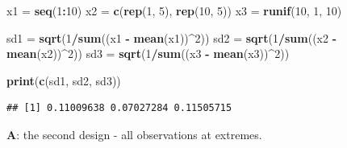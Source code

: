 \documentclass[10pt,ignorenonframetext,]{beamer}
\newenvironment{Shaded}{\begin{snugshade}}{\end{snugshade}}
\newcommand{\KeywordTok}[1]{\textcolor[rgb]{0.13,0.29,0.53}{\textbf{#1}}}
\newcommand{\DecValTok}[1]{\textcolor[rgb]{0.00,0.00,0.81}{#1}}
\newcommand{\StringTok}[1]{\textcolor[rgb]{0.31,0.60,0.02}{#1}}
\newcommand{\OperatorTok}[1]{\textcolor[rgb]{0.81,0.36,0.00}{\textbf{#1}}}
\newcommand{\NormalTok}[1]{#1}
\begin{document}
\begin{frame}[fragile]

\begin{Shaded}
\begin{Highlighting}[]
\NormalTok{x1 =}\StringTok{ }\KeywordTok{seq}\NormalTok{(}\DecValTok{1}\OperatorTok{:}\DecValTok{10}\NormalTok{)}
\NormalTok{x2 =}\StringTok{ }\KeywordTok{c}\NormalTok{(}\KeywordTok{rep}\NormalTok{(}\DecValTok{1}\NormalTok{, }\DecValTok{5}\NormalTok{), }\KeywordTok{rep}\NormalTok{(}\DecValTok{10}\NormalTok{, }\DecValTok{5}\NormalTok{))}
\NormalTok{x3 =}\StringTok{ }\KeywordTok{runif}\NormalTok{(}\DecValTok{10}\NormalTok{, }\DecValTok{1}\NormalTok{, }\DecValTok{10}\NormalTok{)}

\NormalTok{sd1 =}\StringTok{ }\KeywordTok{sqrt}\NormalTok{(}\DecValTok{1}\OperatorTok{/}\KeywordTok{sum}\NormalTok{((x1 }\OperatorTok{-}\StringTok{ }\KeywordTok{mean}\NormalTok{(x1))}\OperatorTok{^}\DecValTok{2}\NormalTok{))}
\NormalTok{sd2 =}\StringTok{ }\KeywordTok{sqrt}\NormalTok{(}\DecValTok{1}\OperatorTok{/}\KeywordTok{sum}\NormalTok{((x2 }\OperatorTok{-}\StringTok{ }\KeywordTok{mean}\NormalTok{(x2))}\OperatorTok{^}\DecValTok{2}\NormalTok{))}
\NormalTok{sd3 =}\StringTok{ }\KeywordTok{sqrt}\NormalTok{(}\DecValTok{1}\OperatorTok{/}\KeywordTok{sum}\NormalTok{((x3 }\OperatorTok{-}\StringTok{ }\KeywordTok{mean}\NormalTok{(x3))}\OperatorTok{^}\DecValTok{2}\NormalTok{))}

\KeywordTok{print}\NormalTok{(}\KeywordTok{c}\NormalTok{(sd1, sd2, sd3))}
\end{Highlighting}
\end{Shaded}

\begin{verbatim}
## [1] 0.11009638 0.07027284 0.11505715
\end{verbatim}

\end{frame}

\begin{frame}

\textbf{A}: the second design - all observations at extremes.

\end{frame}
\end{document}
